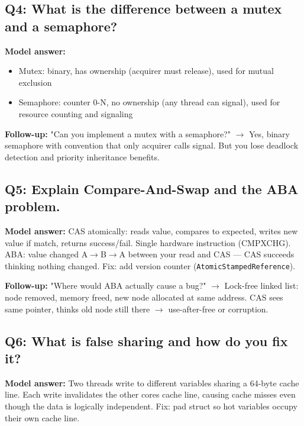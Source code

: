 \documentclass[11pt]{article}
\providecommand{\tightlist}{\setlength{\itemsep}{1pt}\setlength{\parskip}{0pt}}
\begin{document}
\subsection{Q4: What is the difference between a mutex and a semaphore?}\label{q4-what-is-the-difference-between-a-mutex-and-a-semaphore}

\textbf{Model answer:}

\begin{itemize}
\tightlist
\item
  Mutex: binary, has ownership (acquirer must release), used for mutual exclusion
\item
  Semaphore: counter 0-N, no ownership (any thread can signal), used for resource counting and signaling
\end{itemize}

\textbf{Follow-up:} "Can you implement a mutex with a semaphore?" \(\rightarrow\) Yes, binary semaphore with convention that only acquirer calls signal. But you lose deadlock detection and priority inheritance benefits.

\subsection{Q5: Explain Compare-And-Swap and the ABA problem.}\label{q5-explain-compare-and-swap-and-the-aba-problem}

\textbf{Model answer:} CAS atomically: reads value, compares to expected, writes new value if match, returns success/fail. Single hardware instruction (CMPXCHG). ABA: value changed A\(\rightarrow\)B\(\rightarrow\)A between your read and CAS --- CAS succeeds thinking nothing changed. Fix: add version counter (\texttt{AtomicStampedReference}).

\textbf{Follow-up:} "Where would ABA actually cause a bug?" \(\rightarrow\) Lock-free linked list: node removed, memory freed, new node allocated at same address. CAS sees same pointer, thinks old node still there \(\rightarrow\) use-after-free or corruption.

\subsection{Q6: What is false sharing and how do you fix it?}\label{q6-what-is-false-sharing-and-how-do-you-fix-it}

\textbf{Model answer:} Two threads write to different variables sharing a 64-byte cache line. Each write invalidates the other core\textquotesingle s cache line, causing cache misses even though the data is logically independent. Fix: pad struct so hot variables occupy their own cache line.
\end{document}
